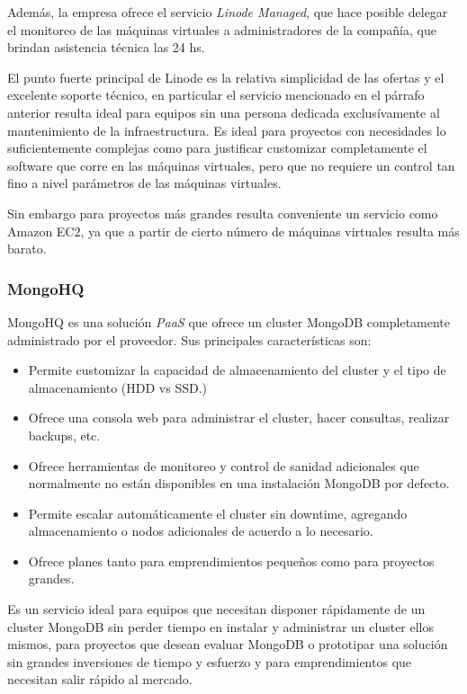 \documentclass[a4paper,10pt,twoside]{article}
\begin{document}
Además, la empresa ofrece el servicio \emph{Linode Managed}, que hace posible delegar el monitoreo de las máquinas virtuales a administradores de la compañía, que brindan asistencia técnica las 24 hs.

El punto fuerte principal de Linode es la relativa simplicidad de las ofertas y el excelente soporte técnico, en particular el servicio mencionado en el párrafo anterior resulta ideal para equipos sin una persona dedicada exclusívamente al mantenimiento de la infraestructura. Es ideal para proyectos con necesidades lo suficientemente complejas como para justificar customizar completamente el software que corre en las máquinas virtuales, pero que no requiere un control tan fino a nivel parámetros de las máquinas virtuales.

Sin embargo para proyectos más grandes resulta conveniente un servicio como Amazon EC2, ya que a partir de cierto número de máquinas virtuales resulta más barato.


\subsubsection{MongoHQ}

MongoHQ es una solución \emph{PaaS} que ofrece un cluster MongoDB completamente administrado por el proveedor. Sus principales características son:

\begin{itemize}
	\item Permite customizar la capacidad de almacenamiento del cluster y el tipo de almacenamiento (HDD vs SSD.)

	\item Ofrece una consola web para administrar el cluster, hacer consultas, realizar backups, etc.

	\item Ofrece herramientas de monitoreo y control de sanidad adicionales que normalmente no están disponibles en una instalación MongoDB por defecto.

	\item Permite escalar automáticamente el cluster sin downtime, agregando almacenamiento o nodos adicionales de acuerdo a lo necesario.

	\item Ofrece planes tanto para emprendimientos pequeños como para proyectos grandes.
\end{itemize}

Es un servicio ideal para equipos que necesitan disponer rápidamente de un cluster MongoDB sin perder tiempo en instalar y administrar un cluster ellos mismos, para proyectos que desean evaluar MongoDB o prototipar una solución sin grandes inversiones de tiempo y esfuerzo y para emprendimientos que necesitan salir rápido al mercado.
\end{document}
